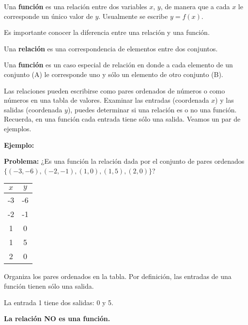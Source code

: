 \documentclass[12pt,a4paper]{article}
\begin{document}
\begin{tcolorbox}[colback=fondorosa,colframe=rojoclaro,title=\textbf{MINI-EXPLICACIÓN: CONCEPTO DE FUNCIONES},breakable]

Una \textbf{función} es una relación entre dos variables $x$, $y$, de manera que a cada $x$ le corresponde un único valor de $y$. Usualmente se escribe $y = f(x)$.

Es importante conocer la diferencia entre una relación y una función.

Una \textbf{relación} es una correspondencia de elementos entre dos conjuntos.

Una \textbf{función} es un caso especial de relación en donde a cada elemento de un conjunto (A) le corresponde uno y sólo un elemento de otro conjunto (B).

\vspace{0.5cm}

Las relaciones pueden escribirse como pares ordenados de números o como números en una tabla de valores. Examinar las entradas (coordenada $x$) y las salidas (coordenada $y$), puedes determinar si una relación es o no una función. Recuerda, en una función cada entrada tiene sólo una salida. Veamos un par de ejemplos.

\vspace{0.5cm}

\textbf{Ejemplo:}

\textbf{Problema:} ¿Es una función la relación dada por el conjunto de pares ordenados $\{(-3, -6), (-2, -1), (1, 0), (1, 5), (2, 0)\}$?

\begin{center}
\begin{tabular}{|c|c|}
\hline
$x$ & $y$ \\
\hline
-3 & -6 \\
-2 & -1 \\
1 & 0 \\
1 & 5 \\
2 & 0 \\
\hline
\end{tabular}
\end{center}

Organiza los pares ordenados en la tabla. Por definición, las entradas de una función tienen sólo una salida.

La entrada 1 tiene dos salidas: 0 y 5.

\textbf{La relación NO es una función.}

\vspace{0.5cm}


\end{tcolorbox}
\end{document}
